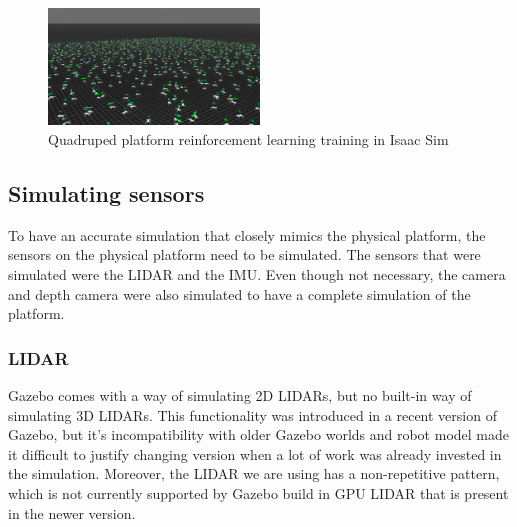 \documentclass[11pt]{article}
\begin{document}
            \begin{figure}[H]
                \centering
                \includegraphics[width=0.5\textwidth]{Images/go2_rl_training.png}
                \caption{Quadruped platform reinforcement learning training in Isaac Sim}
                \label{fig:isaac_sim_quadruped}
            \end{figure}

    \subsection{Simulating sensors}

        To have an accurate simulation that closely mimics the physical platform, the sensors on the physical platform need to be simulated. The sensors that were simulated were the LIDAR and the IMU. Even though not necessary, the camera and depth camera were also simulated to have a complete simulation of the platform.

        \subsubsection{LIDAR}

        Gazebo comes with a way of simulating 2D LIDARs, but no built-in way of simulating 3D LIDARs. This functionality was introduced in a recent version of Gazebo, but it's incompatibility with older Gazebo worlds and robot model made it difficult to justify changing version when a lot of work was already invested in the simulation. Moreover, the LIDAR we are using has a non-repetitive pattern, which is not currently supported by Gazebo build in GPU LIDAR that is present in the newer version. 
        
\end{document}
